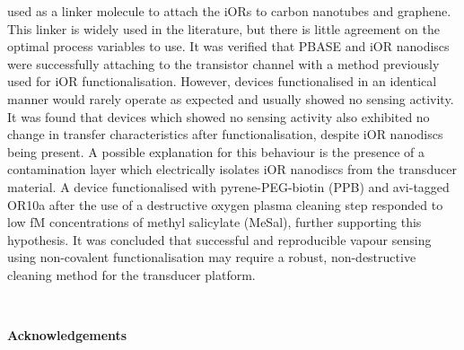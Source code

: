 \documentclass[
  a4paper,
]{scrbook}
\begin{document}
used as a linker molecule to attach the iORs to carbon nanotubes and graphene. This linker is widely used in the literature, but there is little agreement on the optimal process variables to use. It was verified that PBASE and iOR nanodiscs were successfully attaching to the transistor channel with a method previously used for iOR functionalisation. However, devices functionalised in an identical manner would rarely operate as expected and usually showed no sensing activity. It was found that devices which showed no sensing activity also exhibited no change in transfer characteristics after functionalisation, despite iOR nanodiscs being present. A possible explanation for this behaviour is the presence of a contamination layer which electrically isolates iOR nanodiscs from the transducer material. A device functionalised with pyrene-PEG-biotin (PPB) and avi-tagged OR10a after the use of a destructive oxygen plasma cleaning step responded to low fM concentrations of methyl salicylate (MeSal), further supporting this hypothesis. It was concluded that successful and reproducible vapour sensing using non-covalent functionalisation may require a robust, non-destructive cleaning method for the transducer platform.

\fancyhf{} %
\thispagestyle{fancy} %
\renewcommand{\headrulewidth}{0pt}
\fancyfoot[L]{\thepage} %

\clearpage
\newpage
\thispagestyle{empty} %
\mbox{~}
\clearpage
\newpage


\thispagestyle{plain}

\begin{flushleft}
\huge\textbf{Acknowledgements}
\end{flushleft}

\vspace*{\baselineskip}
\end{document}
